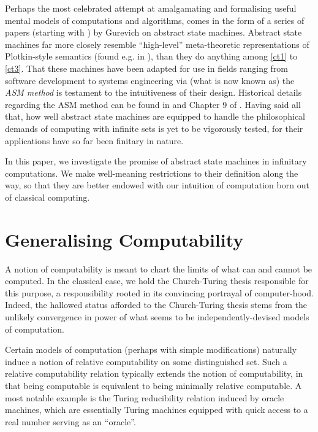 \documentclass[12pt, twoside]{memoir}
\numberwithin{equation}{section}
\theoremstyle{definition}
\theoremstyle{remark}
\theoremstyle{definition}
\theoremstyle{definition}
\theoremstyle{definition}
\theoremstyle{remark}
\begin{document}
Perhaps the most celebrated attempt at amalgamating and formalising useful mental models of computations and algorithms, comes in the form of a series of papers (starting with \cite{gurevich}) by Gurevich on abstract state machines. Abstract state machines far more closely resemble ``high-level'' meta-theoretic representations of Plotkin-style semantics (found e.g. in \cite{plotkin}), than they do anything among \ref{ct1} to \ref{ct3}. That these machines have been adapted for use in fields ranging from software development to systems engineering via (what is now known as) the \textit{ASM method} is testament to the intuitiveness of their design. Historical details regarding the ASM method can be found in \cite{borger} and Chapter 9 of \cite{borgerbook}. Having said all that, how well abstract state machines are equipped to handle the philosophical demands of computing with infinite sets is yet to be vigorously tested, for their applications have so far been finitary in nature.

In this paper, we investigate the promise of abstract state machines in infinitary computations. We make well-meaning restrictions to their definition along the way, so that they are better endowed with our intuition of computation born out of classical computing. 

\section{Generalising Computability}\label{subsec22}

A notion of computability is meant to chart the limits of what can and cannot be computed. In the classical case, we hold the Church-Turing thesis responsible for this purpose, a responsibility rooted in its convincing portrayal of computer-hood. Indeed, the hallowed status afforded to the Church-Turing thesis stems from the unlikely convergence in power of what seems to be independently-devised models of computation.

Certain models of computation (perhaps with simple modifications) naturally induce a notion of relative computability on some distinguished set. Such a relative computability relation typically extends the notion of computability, in that being computable is equivalent to being minimally relative computable. A most notable example is the Turing reducibility relation induced by oracle machines, which are essentially Turing machines equipped with quick access to a real number serving as an ``oracle''. 
\end{document}
